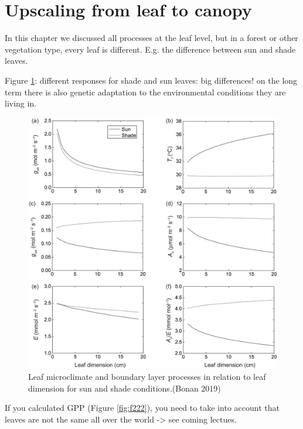 \documentclass[12pt,oneside]{book}
\begin{document}
\section{Upscaling from leaf to
canopy}\label{upscaling-from-leaf-to-canopy}

In this chapter we discussed all processes at the leaf level, but in a
forest or other vegetation type, every leaf is different. E.g. the
difference between sun and shade leaves.

Figure \ref{fig:f221}: different responses for shade and sun leaves: big
differences! on the long term there is also genetic adaptation to the
environmental conditions they are living in.

\begin{figure}

{\centering \includegraphics[width=0.8\linewidth]{figures/chap2/sun_shade} 

}

\caption{Leaf microclimate and boundary layer processes in relation to leaf dimension for sun and shade conditions.(Bonan 2019)}\label{fig:f221}
\end{figure}

If you calculated GPP (Figure \ref{fig:f222}), you need to take into
account that leaves are not the same all over the world -\textgreater{}
see coming lectues.
\end{document}
